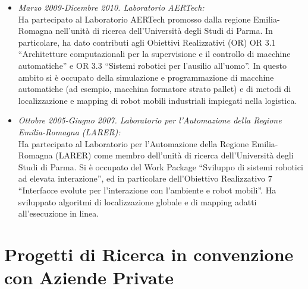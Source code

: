 \documentclass[11pt]{article}
\newcommand{\ITEMDATE}[1]{\item \textit{#1:}\\}
\begin{document}
\begin{itemize}
\ITEMDATE{Marzo 2009-Dicembre 2010. Laboratorio AERTech}
Ha partecipato al Laboratorio AERTech promosso dalla regione Emilia-Romagna nell'unit\`a di ricerca
dell'Universit\`a degli Studi di Parma.
In particolare, ha dato contributi agli Obiettivi Realizzativi (OR)
OR 3.1 ``Architetture computazionali per la supervisione e il controllo di macchine automatiche'' e
OR 3.3 ``Sistemi robotici per l'ausilio all'uomo''.
In questo ambito si \`e occupato della simulazione e programmazione di macchine automatiche 
(ad esempio, macchina formatore strato pallet) e di metodi di localizzazione e mapping 
di robot mobili industriali impiegati nella logistica. 

\ITEMDATE{Ottobre 2005-Giugno 2007. Laboratorio per l'Automazione della Regione Emilia-Romagna (LARER)}
Ha partecipato al Laboratorio per l'Automazione della Regione Emilia-Romagna (LARER) 
come membro dell'unit\`a di ricerca dell'Universit\`a degli Studi di Parma.
Si \`e occupato del Work Package ``Sviluppo di sistemi robotici ad elevata interazione'',
ed in particolare dell'Obiettivo Realizzativo 7 ``Interfacce evolute per l'interazione con l'ambiente e robot mobili''.
Ha sviluppato algoritmi di localizzazione globale e di mapping adatti all'esecuzione in linea.

\end{itemize}

\section*{Progetti di Ricerca in convenzione con Aziende Private}
\end{document}
